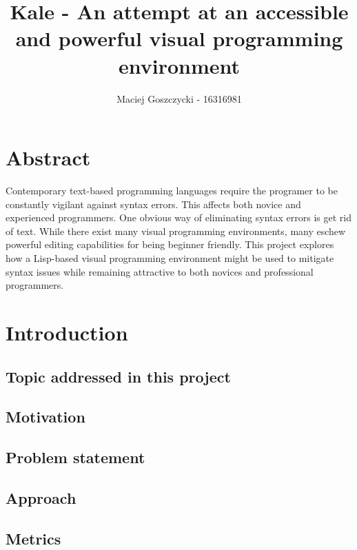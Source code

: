 \documentclass[11pt]{report}
\title{Kale - An attempt at an accessible and powerful visual programming
environment}
\author{Maciej Goszczycki - 16316981}
\date{}
\begin{document}
\maketitle
\tableofcontents


\chapter{Abstract}
Contemporary text-based programming languages require the programer to be
constantly vigilant against syntax errors. This affects both novice and
experienced programmers. One obvious way of eliminating syntax errors is
get rid of text. While there exist many visual programming environments, many
eschew powerful editing capabilities for being beginner friendly.
This project explores how a Lisp-based visual programming environment might be
used to mitigate syntax issues while remaining attractive to both novices and
professional programmers.

\chapter{Introduction}
\section{Topic addressed in this project}
\section{Motivation}
\section{Problem statement}
\section{Approach}
\section{Metrics}
\end{document}
